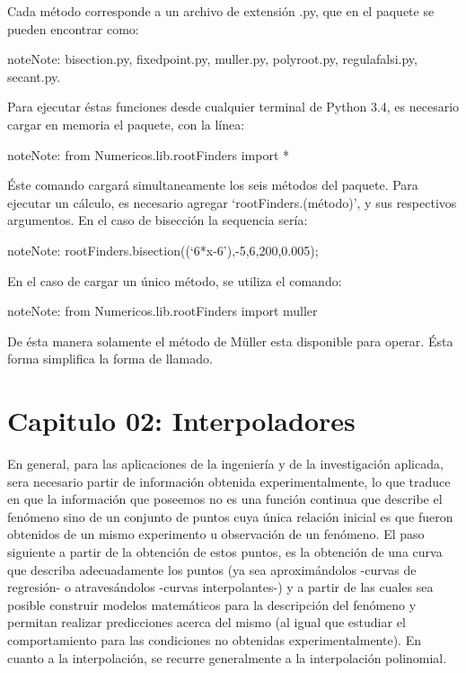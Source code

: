 \documentclass[letterpaper,10pt,oneside]{sphinxmanual}
\theoremstyle{plain}%
\theoremstyle{definition}%
\theoremstyle{remark}%
\begin{document}
\label{chapter01:sequencia-de-llamado}
\noindent Cada método corresponde a un archivo de extensión .py, que en el paquete se pueden encontrar como:\medskip

\begin{notice}{note}{Note:}
bisection.py, fixedpoint.py, muller.py, polyroot.py, regulafalsi.py, secant.py.
\end{notice}

Para ejecutar éstas funciones desde cualquier terminal de Python 3.4, es necesario cargar en memoria el paquete, con la línea:

\begin{notice}{note}{Note:}
from Numericos.lib.rootFinders import *
\end{notice}

Éste comando cargará simultaneamente los seis métodos del paquete. Para ejecutar un cálculo, es necesario agregar `rootFinders.(método)',
y sus respectivos argumentos. En el caso de bisección la sequencia sería:

\begin{notice}{note}{Note:}
rootFinders.bisection((`6*x-6'),-5,6,200,0.005);
\end{notice}

En el caso de cargar un único método, se utiliza el comando:

\begin{notice}{note}{Note:}
from Numericos.lib.rootFinders import muller
\end{notice}

De ésta manera solamente el método de Müller esta disponible para operar. Ésta forma simplifica la forma de llamado.


\chapter{Capitulo 02: Interpoladores}
\label{chapter02::doc}\label{chapter02:capitulo-02-interpoladores}

\noindent En general, para las aplicaciones de la ingeniería y de la investigación aplicada, sera necesario partir de información obtenida experimentalmente, lo que traduce en que la información que poseemos no es una función continua que describe el fenómeno sino de un conjunto de puntos cuya única relación inicial es que fueron obtenidos de un mismo experimento u observación de un fenómeno. El paso siguiente a partir de la obtención de estos puntos, es la obtención de una curva que describa adecuadamente los puntos (ya sea aproximándolos -curvas de regresión- o atravesándolos -curvas interpolantes-) y a partir de las cuales sea posible
construir modelos matemáticos para la descripción del fenómeno y permitan realizar predicciones acerca del mismo (al igual que estudiar el comportamiento para las condiciones no obtenidas experimentalmente). En cuanto a la interpolación, se recurre generalmente a la interpolación polinomial.\medskip
\end{document}
